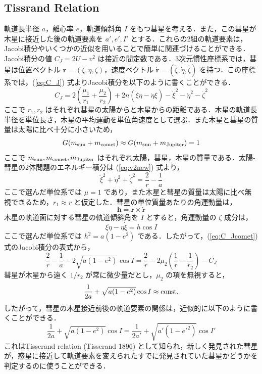 \documentclass[11pt,a4paper,oneside,onecolumn]{jarticle}
\begin{document}
\subsection{Tissrand Relation}
軌道長半径 $a$，離心率 $e$，軌道傾斜角 $I$ をもつ彗星を考える．また，この彗星が木星に接近した後の軌道要素を $a', e', I'$ とする．これらの2組の軌道要素は，Jacobi積分やいくつかの近似を用いることで簡単に関連づけることができる．Jacobi積分の値 $C_J = 2 U - v^2$ は接近の間定数である．3次元慣性座標系では，彗星は位置ベクトル ${\bm r} = (\xi, \eta, \zeta)$，速度ベクトル $\dot{{\bm r}} = (\dot{\xi}, \dot{\eta}, \dot{\zeta})$ を持つ．この座標系では，(\ref{eq:C_J}) 式よりJacobi積分を以下のように書くことができる．
\begin{equation}
C_J = 2 \left( \frac{\mu_1}{r_1} + \frac{\mu_2}{r_2} \right) + 2 n (\dot{\xi} \eta - \dot{\eta} \xi) - \dot{\xi}^2 - \dot{\eta}^2 - \dot{\zeta}^2 \label{eq:C_Jcomet}
\end{equation}
ここで $r_1, r_2$ はそれぞれ彗星の太陽からと木星からの距離である．木星の軌道長半径を単位長さ，木星の平均運動を単位角速度として選ぶ．また木星と彗星の質量は太陽に比べ十分に小さいため，
\begin{equation}
G (m_{\rm sun} + m_{\rm comet}) \approx G (m_{\rm sun} + m_{\rm Jupiter}) = 1
\end{equation}
ここで $m_{\rm sun}, m_{\rm comet}, m_{\rm Jupiter}$ はそれぞれ太陽，彗星，木星の質量である．太陽-彗星の2体問題のエネルギー積分は (\ref{eq:v2new}) 式より，
\begin{equation}
\dot{\xi}^2 + \dot{\eta}^2 + \dot{\zeta}^2 = \frac{2}{r} - \frac{1}{a}
\end{equation}
ここで選んだ単位系では $\mu = 1$ であり，また木星と彗星の質量は太陽に比べ無視できるため，$r_1 \approx r$ と仮定した．彗星の単位質量あたりの角運動量は，
\begin{equation}
{\bm h} = {\bm r} \times \dot{{\bm r}}
\end{equation}
木星の軌道面に対する彗星の軌道傾斜角を $I$ とすると，角運動量の $\zeta$ 成分は，
\begin{equation}
\xi \dot{\eta} - \eta \dot{\xi} = h \cos I
\end{equation}
ここで選んだ単位系では $h^2 = a (1 - e^2)$ である．したがって，(\ref{eq:C_Jcomet}) 式のJacobi積分の表式から，
\begin{equation}
\frac{2}{r} - \frac{1}{a} - 2 \sqrt{a (1 - e^2)} \cos I = \frac{2}{r} - 2 \mu_2 \left( \frac{1}{r} - \frac{1}{r_2} \right) - C_J
\end{equation}
彗星が木星から遠く $1/r_2$ が常に微少量だとし，$\mu_2$ の項を無視すると，
\begin{equation}
\frac{1}{2a} + \sqrt{a (1 - e^2)} \cos I \approx {\rm const.}
\end{equation}
したがって，彗星の木星接近前後の軌道要素の関係は，近似的に以下のように書くことができる．
\begin{equation}
\frac{1}{2a} + \sqrt{a (1 - e^2)} \cos I = \frac{1}{2a'} + \sqrt{a' (1 - e'^2)} \cos I'
\end{equation}
これはTisserand relation (Tisserand 1896) として知られ，新しく発見された彗星が，惑星に接近して軌道要素を変えられたすでに発見されていた彗星かどうかを判定するのに使うことができる．
\end{document}
